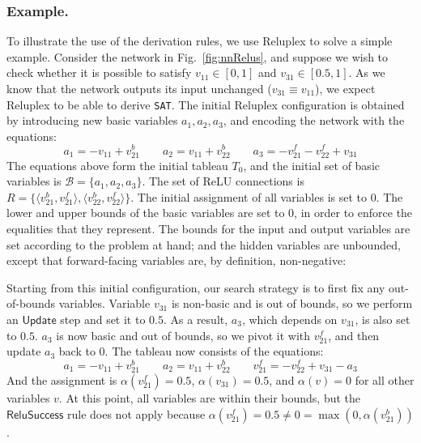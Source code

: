 \documentclass[a4paper]{llncs}
\newcommand{\basic}{\mathcal{B}}
\newcommand{\reluSet}{R}
\newcommand{\assignment}{\alpha{}}
\newcommand{\sat}{\texttt{SAT}}
\newcommand{\rulename}[1]{\ensuremath{\mathsf{#1}}\xspace}
\newcommand{\update}{\rulename{Update}}
\newcommand{\reluSuccess}{\rulename{ReluSuccess}}
\begin{document}
\subsubsection{Example.}
\sloppy
To illustrate the use of the derivation rules, we use Reluplex to solve a
simple example. Consider the network in
Fig.~\ref{fig:nnRelus}, and suppose we wish to check whether 
it is possible to satisfy $v_{11}\in [0,1]$ and $v_{31}\in [0.5,1]$. 
As we know that the network outputs its input unchanged ($v_{31}\equiv v_{11}$), we expect
Reluplex to be able to derive \sat{}.
The initial Reluplex configuration is obtained
by introducing new basic variables $a_1,a_2,a_3$,
and encoding the network with the equations:
\[
  a_1 = -v_{11} + v^b_{21}  \qquad
  a_2 = v_{11} + v^b_{22}  \qquad
  a_3 = - v^f_{21} - v^f_{22} + v_{31}
\]
The equations above form the initial tableau $T_0$, and the
initial set of basic variables is
$\basic{} = \{a_1,a_2,a_3\}$. 
The set of ReLU connections is 
$\reluSet=\{
\langle v^b_{21},v^f_{21} \rangle,
\langle v^b_{22},v^f_{22} \rangle
\}$.
The initial assignment of all variables is set to $0$.
The lower and upper bounds of the
basic variables are set to 0, in order to enforce the equalities
that they represent. The bounds for the input and output variables are set
according to the problem at hand; and the hidden variables are
unbounded, except that forward-facing variables are, by
definition, non-negative:

\noindent
\begin{center}
\end{center}


Starting from this initial configuration, our search strategy is to first fix
any out-of-bounds variables. Variable $v_{31}$ is non-basic and is out of bounds, so we
perform an \update{} step and set it to $0.5$. As a result, $a_3$,
which depends on $v_{31}$, is also set to $0.5$. $a_3$ is now basic
and out of bounds, so we pivot it with $v_{21}^f$, and then update $a_3$ back to
$0$. The tableau now consists of the equations:
\[
  a_1 = -v_{11} + v^b_{21}  \qquad
  a_2 = v_{11} + v^b_{22}  \qquad
  v_{21}^f = -v_{22}^f + v_{31} -a_3  
\]
And the assignment is
$\assignment(v_{21}^f) = 0.5$,
$\assignment(v_{31}) = 0.5$,
and $\assignment(v) = 0$ 
for all other variables $v$. At this
point, all variables are within
their bounds, but the \reluSuccess{} rule does not
apply because
 $\assignment(v_{21}^f) = 0.5 \neq 0 =
\max{}(0,\assignment(v_{21}^b))$. 
\end{document}
